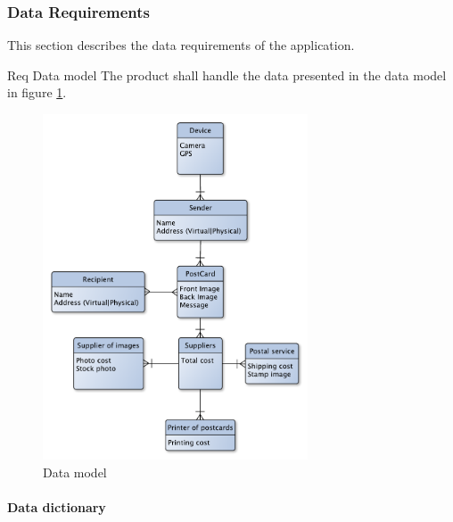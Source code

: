 \documentclass[10pt,a4paper]{article}
\begin{document}
	

\subsubsection{Data Requirements}
This section describes the data requirements of the application.


\begin {description}
	\item [Req \thesubsubsection {.\thedata} Data model] The product shall handle the data presented in the data model in figure \ref{fig:datamodel}.
\end{description}

\begin{figure}[h!]
\centering
\includegraphics[width=0.7\textwidth]{Data_figures/DataModel.pdf}
\caption{Data model}
\label{fig:datamodel}
\end{figure}
\FloatBarrier
\paragraph{Data dictionary}
\end{document}

